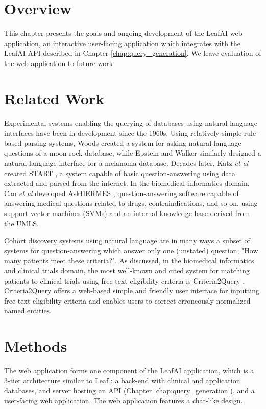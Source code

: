 \documentclass[../main.tex]{subfiles}
\begin{document}
\section{Overview}

This chapter presents the goals and ongoing development of the LeafAI web application, an interactive user-facing application which integrates with the LeafAI API described in Chapter \ref{chap:query_generation}. We leave evaluation of the web application to future work

\section{Related Work}

Experimental systems enabling the querying of databases using natural language interfaces have been in development since the 1960s. Using relatively simple rule-based parsing systems, Woods \cite{woods1973progress} created a system for asking natural language questions of a moon rock database, while Epstein and Walker \cite{epstein1978natural} similarly designed a natural language interface for a melanoma database. Decades later, Katz \textit{et al} created START \cite{katz1999integrating}, a system capable of basic question-answering using data extracted and parsed from the internet. In the biomedical informatics domain, Cao \textit{et al} developed AskHERMES \cite{cao2011askhermes}, question-answering software capable of answering medical questions related to drugs, contraindications, and so on, using support vector machines (SVMs) and an internal knowledge base derived from the UMLS.

Cohort discovery systems using natural language are in many ways a subset of systems for question-answering which answer only one (unstated) question, "How many patients meet these criteria?". As discussed, in the biomedical informatics and clinical trials domain, the most well-known and cited system for matching patients to clinical trials using free-text eligibility criteria is Criteria2Query \cite{yuan2019criteria2query, fang2022combining}. Criteria2Query offers a web-based simple and friendly user interface for inputting free-text eligibility criteria and enables users to correct erroneously normalized named entities.

\section{Methods}

The web application forms one component of the LeafAI application, which is a 3-tier architecture similar to Leaf \cite{dobbins2019leaf}: a back-end with clinical and application databases, and server hosting an API (Chapter \ref{chap:query_generation}), and a user-facing web application. The web application features a chat-like design.
\end{document}
